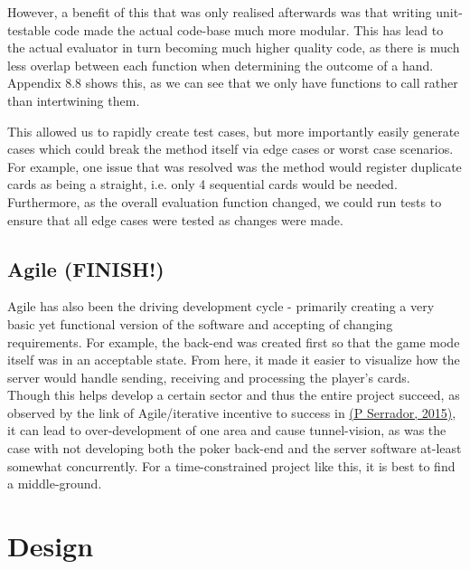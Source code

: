 \documentclass[11pt]{article}
\begin{document}
However, a benefit of this that was only realised afterwards was that writing unit-testable code made the actual code-base much more modular. %
This has lead to the actual evaluator in turn becoming much higher quality code, as there is much less overlap between each function when determining the outcome of a hand.  Appendix 8.8 shows this, as we can see that we only have functions to call rather than intertwining them.



This allowed us to rapidly create test cases, but more importantly easily generate cases which could break the method itself via edge cases or worst case scenarios. For example, one issue that was resolved was the method would register duplicate cards as being a straight, i.e. only 4 sequential cards would be needed. Furthermore, as the overall evaluation function changed, we could run tests to ensure that all edge cases were tested as changes were made.\\



\subsection{Agile (FINISH!)}
Agile has also been the driving development cycle - primarily creating a very basic yet functional version of the software and accepting of changing requirements. For example, the back-end was created first so that the game mode itself was in an acceptable state. From here, it made it easier to visualize how the server would handle sending, receiving and processing the player's cards. \\

Though this helps develop a certain sector and thus the entire project succeed, as observed by the link of Agile/iterative incentive to success in \hyperlink{agile_success}{(P Serrador, 2015)}, it can lead to over-development of one area and cause tunnel-vision, as was the case with not developing both the poker back-end and the server software at-least somewhat concurrently. For a time-constrained project like this, it is best to find a middle-ground. 



\newpage
\section{Design}
\end{document}
